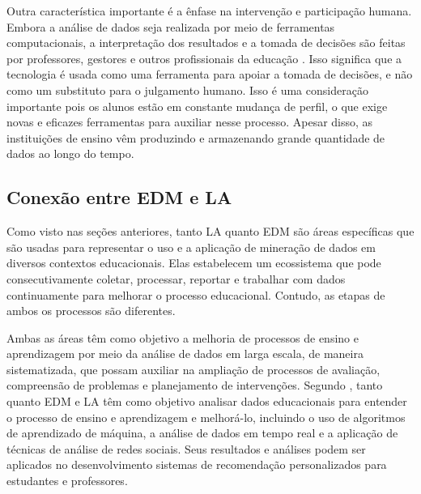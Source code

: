 {Outra característica importante é a ênfase na intervenção e participação humana. Embora a análise de dados seja realizada por meio de ferramentas computacionais, a interpretação dos resultados e a tomada de decisões são feitas por professores, gestores e outros profissionais da educação \cite{Barone_2020}. Isso significa que a tecnologia é usada como uma ferramenta para apoiar a tomada de decisões, e não como um substituto para o julgamento humano. Isso é uma consideração importante pois os alunos estão em constante mudança de perfil, o que exige novas e eficazes ferramentas para auxiliar nesse processo. Apesar disso, as instituições de ensino vêm produzindo e armazenando grande quantidade de dados ao longo do tempo.}



\subsection{Conexão entre EDM e LA}

Como visto nas seções anteriores, tanto LA quanto EDM são áreas específicas que são usadas para representar o uso e a aplicação de mineração de dados em diversos contextos educacionais. Elas estabelecem um ecossistema que pode consecutivamente coletar, processar, reportar e trabalhar com dados continuamente para melhorar o processo educacional. Contudo, as etapas de ambos os processos são diferentes.

{Ambas as áreas têm como objetivo a melhoria de processos de ensino e aprendizagem por meio da análise de dados em larga escala, de maneira sistematizada, que possam auxiliar na ampliação de processos de avaliação, compreensão de problemas e planejamento de intervenções. Segundo , tanto quanto EDM e LA têm como objetivo analisar dados educacionais para entender o processo de ensino e aprendizagem e melhorá-lo, incluindo o uso de algoritmos de aprendizado de máquina, a análise de dados em tempo real e a aplicação de técnicas de análise de redes sociais. Seus resultados e análises podem ser aplicados no desenvolvimento sistemas de recomendação personalizados para estudantes e professores.}

